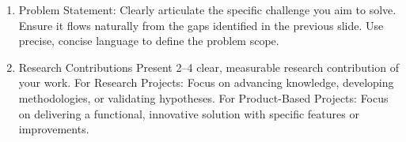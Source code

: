 \begin{enumerate}
    \item Problem Statement: Clearly articulate the specific challenge you aim to solve. Ensure it flows naturally from the gaps identified in the previous slide. Use precise, concise language to define the problem scope.
    \item  Research Contributions Present 2–4 clear, measurable research contribution of your work. For Research Projects: Focus on advancing knowledge, developing methodologies, or validating hypotheses. For Product-Based Projects: Focus on delivering a functional, innovative solution with specific features or improvements.
\end{enumerate}